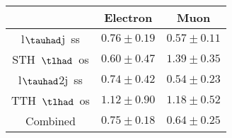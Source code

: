 \centering
\begin{tabular}{|c|c|c|} \hline
 & Electron & Muon\\\hline
l$\tauhad$j~ss & $0.76\pm0.19$ & $0.57\pm0.11$\\\hline
STH~$\tlhad$~os & $0.60\pm0.47$ & $1.39\pm0.35$\\\hline
l$\tauhad$2j~ss & $0.74\pm0.42$ & $0.54\pm0.23$\\\hline
TTH~$\tlhad$~os & $1.12\pm0.90$ & $1.18\pm0.52$\\\hline
Combined & $0.75\pm0.18$ & $0.64\pm0.25$\\\hline
\end{tabular}
